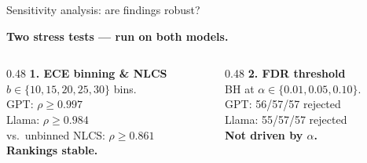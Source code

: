 \documentclass[aspectratio=169,11pt]{beamer}
\begin{document}
\begin{frame}{Sensitivity analysis: are findings robust?}

\textbf{Two stress tests — run on both models.}

\vspace{0.6em}
\begin{columns}[T]
  \begin{column}{0.48\textwidth}
    \textbf{1. ECE binning \& NLCS}\\[0.4em]
    \small
    $b \in \{10, 15, 20, 25, 30\}$ bins.\\[0.3em]
    GPT: $\rho \geq 0.997$\\
    Llama: $\rho \geq 0.984$\\[0.3em]
    vs.\ unbinned NLCS: $\rho \geq 0.861$\\[0.3em]
    \textbf{Rankings stable.}
  \end{column}
  \begin{column}{0.48\textwidth}
    \textbf{2. FDR threshold}\\[0.4em]
    \small
    BH at $\alpha \in \{0.01, 0.05, 0.10\}$.\\[0.3em]
    GPT: 56/57/57 rejected\\
    Llama: 55/57/57 rejected\\[0.3em]
    \textbf{Not driven by $\alpha$.}
  \end{column}
\end{columns}
\end{frame}
\end{document}
